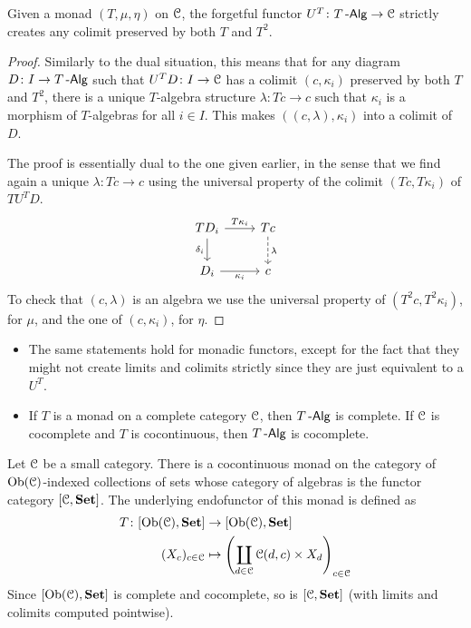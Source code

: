 \documentclass[a4paper,11pt,oneside,openany]{scrbook}
\begin{document}
\begin{prop}\label{create colims}
	Given a monad $(T,\mu,\eta)$ on $\operatorname{\mathcal{C}}$, the forgetful functor $U^T\colon T\operatorname{-\mathsf{Alg}}\rightarrow\operatorname{\mathcal{C}}$ strictly creates any colimit preserved by both $T$ and $T^2$.
\end{prop}

\begin{proof}
	Similarly to the dual situation, this means that for any diagram $D\colon I\rightarrow T\operatorname{-\mathsf{Alg}}$ such that $U^TD\colon I\rightarrow\operatorname{\mathcal{C}}$ has a colimit $(c,\kappa_i)$ preserved by both $T$ and $T^2$, there is a unique $T$-algebra structure $\lambda\colon Tc\rightarrow c$ such that $\kappa_i$ is a morphism of $T$-algebras for all $i\in I$. This makes $((c,\lambda),\kappa_i)$ into a colimit of $D$.

	The proof is essentially dual to the one given earlier, in the sense that we
	find again a unique $\lambda\colon Tc\rightarrow c$ using the universal
	property of the colimit $(Tc,T\kappa_i)$ of $TU^TD$.
	\[
		\begin{tikzcd}
			TD_i\ar[r, "T\kappa_i"]\ar[d, "\delta_i"']
			& Tc\ar[d, dashed, "\lambda"] \\
			D_i\ar[r, "\kappa_i"']
			& c
		\end{tikzcd}
	\]
	To check that $(c,\lambda)$ is an algebra we use the universal property of $(T^2c,T^2\kappa_i)$, for $\mu$, and the one of $(c,\kappa_i)$, for $\eta$.
\end{proof}

\begin{rmk}
    \begin{itemize}
        \item The same statements hold for monadic functors, except for the fact that they might not create limits and colimits strictly since they are just equivalent to a $U^T$.
        \item If $T$ is a monad on a complete category $\operatorname{\mathcal{C}}$, then $T\operatorname{-\mathsf{Alg}}$ is complete. If $\operatorname{\mathcal{C}}$ is cocomplete and $T$ is cocontinuous, then $T\operatorname{-\mathsf{Alg}}$ is cocomplete.
    \end{itemize}
\end{rmk}

\begin{exmp}
	Let $\operatorname{\mathcal{C}}$ be a small category. There is a cocontinuous monad on the category of $\operatorname{Ob}(\operatorname{\mathcal{C}})$-indexed collections of sets whose category of algebras is the functor category $[\operatorname{\mathcal{C}},{\normalfont\textbf{Set}}]$. The underlying endofunctor of this monad is defined as
	\begin{align*}
		T\colon[\operatorname{Ob}(\operatorname{\mathcal{C}}),{\normalfont\textbf{Set}}] & \to[\operatorname{Ob}(\operatorname{\mathcal{C}}),{\normalfont\textbf{Set}}]                                               \\
		(X_c)_{c\in\operatorname{\mathcal{C}}}        & \mapsto \left(\coprod_{d\in\operatorname{\mathcal{C}}}\operatorname{\mathcal{C}}(d,c)\times X_d\right)_{c\in\operatorname{\mathcal{C}}}
	\end{align*}
	Since $[\operatorname{Ob}(\operatorname{\mathcal{C}}),{\normalfont\textbf{Set}}]$ is complete and cocomplete, so is $[\operatorname{\mathcal{C}},{\normalfont\textbf{Set}}]$ (with limits and colimits computed pointwise).
\end{exmp}
\end{document}
